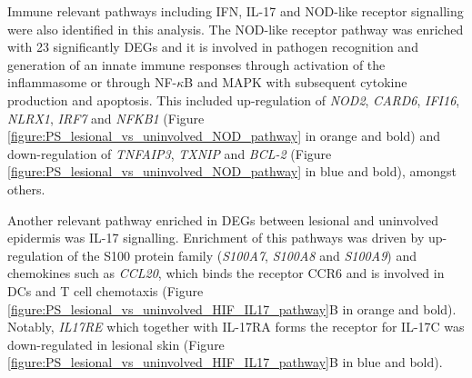 Immune relevant pathways including IFN, IL-17 and NOD-like receptor signalling were also identified in this analysis. The NOD-like receptor pathway was enriched with 23 significantly DEGs and it is involved in pathogen recognition and generation of an innate immune responses through activation of the inflammasome or through NF-$\kappa$B and MAPK with subsequent cytokine production and apoptosis.  %
This included up-regulation of \textit{NOD2}, \textit{CARD6},  \textit{IFI16}, \textit{NLRX1}, \textit{IRF7} and \textit{NFKB1} (Figure \ref{figure:PS_lesional_vs_uninvolved_NOD_pathway} in orange and bold) and down-regulation of \textit{TNFAIP3}, \textit{TXNIP} and \textit{BCL-2} (Figure \ref{figure:PS_lesional_vs_uninvolved_NOD_pathway} in blue and bold), amongst others. %

Another relevant pathway enriched in DEGs between lesional and uninvolved epidermis was IL-17 signalling. Enrichment of this pathways was driven by up-regulation of the S100 protein family (\textit{S100A7}, \textit{S100A8} and \textit{S100A9}) and chemokines such as \textit{CCL20}, which binds the receptor CCR6 and is involved in DCs and T cell chemotaxis (Figure \ref{figure:PS_lesional_vs_uninvolved_HIF_IL17_pathway}B in orange and bold). Notably, \textit{IL17RE} which together with IL-17RA forms the receptor for IL-17C was down-regulated in lesional skin (Figure \ref{figure:PS_lesional_vs_uninvolved_HIF_IL17_pathway}B in blue and bold). 

